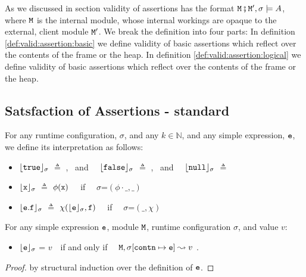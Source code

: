 As we discussed in section  validity of assertions has the format ${\mbox{\tt{\ensuremath{{\mbox{\tt{M}}}}}}}\fatsemi {\mbox{\tt{\ensuremath{{\mbox{\tt{M}}}}}}}', \sigma \models A$, where  ${\mbox{\tt{\ensuremath{{\mbox{\tt{M}}}}}}}$ is the internal module, whose internal workings
 are opaque to the external, client module ${\mbox{\tt{\ensuremath{{\mbox{\tt{M}}}}}}}'$.
 We break the definition into four parts: In definition  \ref{def:valid:assertion:basic} we define validity 
 of basic assertions which reflect over the contents of the frame or the heap. 
 In  definition  \ref{def:valid:assertion:logical} we define validity 
 of basic assertions which reflect over the contents of the frame or the heap. 

\subsection{Satsfaction of Assertions - standard}


 \begin{definition}

For any runtime configuration, $\sigma$, and any $k\in \mathbb{N}$, and any simple expression, ${\mbox{\tt{e}}}$, we define its interpretation as follows:

\begin{itemize}
     \item
  ${\lfloor{ {{\mbox{\tt{true}}}}}\rfloor_{\sigma}}$ $ \triangleq$   , \ and \ \    ${\lfloor{ {{\mbox{\tt{false}}}}}\rfloor_{\sigma}}$ $ \triangleq$ , \ and \ \
   $\interp {}{\sigma}$ $ \triangleq$  \prg{null}
  \item
  ${\lfloor{ {{\mbox{\tt{x}}}}}\rfloor_{\sigma}}$ $ \triangleq$ $\phi({\mbox{\tt{x}}})$  \ \ if \ \ $\sigma$=$(\phi\cdot\_,\_)$
  \item
  ${\lfloor{ {\ensuremath{{\mbox{\tt{e}}}}.{\mbox{\tt{f}}}}}\rfloor_{\sigma}}$ $ \triangleq$ $\chi({{\lfloor{ {\ensuremath{{\mbox{\tt{e}}}}}}\rfloor_{\sigma}}}, {\mbox{\tt{f}}})$  \ \ if \ \ $\sigma$=$(\_,\chi)$
   \end{itemize}
\end{definition}

\begin{lemma}
For any simple expression ${\mbox{\tt{e}}}$, module ${\mbox{\tt{\ensuremath{{\mbox{\tt{M}}}}}}}$,  runtime configuration $\sigma$, and value $v$:
\begin{itemize}
  \item
   ${\lfloor{ {\ensuremath{{\mbox{\tt{e}}}}}}\rfloor_{\sigma}}$ = $v$\ \     if and only if \ \ ${\mbox{\tt{\ensuremath{{\mbox{\tt{M}}}}}}}, \sigma[{\mbox{\tt{contn}}}\mapsto {\mbox{\tt{e}}}] \leadsto v$ .
\end{itemize}
\end{lemma}
\begin{proof} by structural induction  over the definition of ${\mbox{\tt{e}}}$.\end{proof}
   

